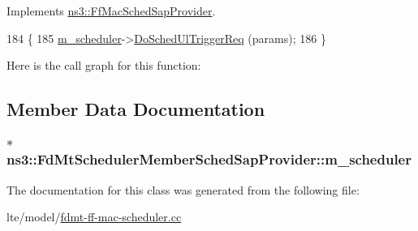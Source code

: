 Implements \hyperlink{classns3_1_1FfMacSchedSapProvider_a7bd978ea17a587a1626ef684be006c04}{ns3\+::\+Ff\+Mac\+Sched\+Sap\+Provider}.


\begin{DoxyCode}
184 \{
185   \hyperlink{classns3_1_1FdMtSchedulerMemberSchedSapProvider_aa742846f6610f058341167d53c0b7777}{m\_scheduler}->\hyperlink{classns3_1_1FdMtFfMacScheduler_adeec9e8c1bed654caf445171337f1a66}{DoSchedUlTriggerReq} (params);
186 \}
\end{DoxyCode}


Here is the call graph for this function\+:




\subsection{Member Data Documentation}
\subsubsection[{\texorpdfstring{m\+\_\+scheduler}{m_scheduler}}]{$\ast$ ns3\+::\+Fd\+Mt\+Scheduler\+Member\+Sched\+Sap\+Provider\+::m\+\_\+scheduler\hspace{0.3cm}{\ttfamily [private]}}\hypertarget{classns3_1_1FdMtSchedulerMemberSchedSapProvider_aa742846f6610f058341167d53c0b7777}{}\label{classns3_1_1FdMtSchedulerMemberSchedSapProvider_aa742846f6610f058341167d53c0b7777}


The documentation for this class was generated from the following file\+:\begin{DoxyCompactItemize}
\item 
lte/model/\hyperlink{fdmt-ff-mac-scheduler_8cc}{fdmt-\/ff-\/mac-\/scheduler.\+cc}\end{DoxyCompactItemize}
